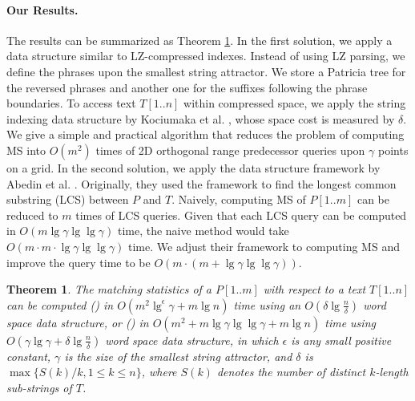 \documentclass[smallabstract,smallcaptions]{dccpaper}
\newtheorem{theorem}{Theorem}
\begin{document}
	\paragraph{Our Results.} The results can be summarized as Theorem \ref{theorem_for_all}.
	In the first solution, we apply a data structure similar to LZ-compressed indexes. Instead of using LZ parsing, we define the phrases upon the smallest string attractor. 
	We store a Patricia tree for the reversed phrases and another one for the suffixes following the phrase boundaries.
	To access text $T[1..n]$ within compressed space, we apply the string indexing data structure by Kociumaka et al. \cite{kociumaka2021towards}, whose space cost is measured by $\delta$.
	We give a simple and practical algorithm that reduces the problem of computing MS into $O(m^2)$ times of 2D orthogonal range predecessor queries upon $\gamma$ points on a grid.
	In the second solution, we apply the data structure framework by Abedin et al. \cite{abedin2018heaviest}. Originally, they used the framework to find the longest common substring (LCS) between $P$ and $T$. Naively, computing MS of $P[1..m]$ can be reduced to $m$ times of LCS queries. Given that each LCS query can be computed in $O(m\lg \gamma \lg \lg \gamma)$ time, the naive method would take $O(m \cdot m\cdot\lg \gamma \lg \lg \gamma)$ time. 
	We adjust their framework to computing MS and improve the query time to be $O(m \cdot (m+\lg \gamma \lg \lg \gamma))$.
	
	\begin{theorem}
		\label{theorem_for_all}
		The matching statistics of a $P[1..m]$ with respect to a text $T[1..n]$ can be computed () in $O(m^2 \lg^{\epsilon} \gamma + m\lg n)$ time using an $O(\delta \lg \frac{n}{\delta})$ word space data structure, or () in $O(m^2 + m \lg \gamma \lg \lg \gamma + m\lg n)$ time using $O(\gamma \lg \gamma + \delta \lg \frac{n}{\delta})$ word space data structure, in which $\epsilon$ is any small positive constant, $\gamma$ is the size of the smallest string attractor, and $\delta$ is $\max\{ S(k)/ k, 1\leq k\leq n \}$, where  $S(k)$ denotes the number of distinct $k$-length sub-strings of $T$.
	\end{theorem}
	
\end{document}
